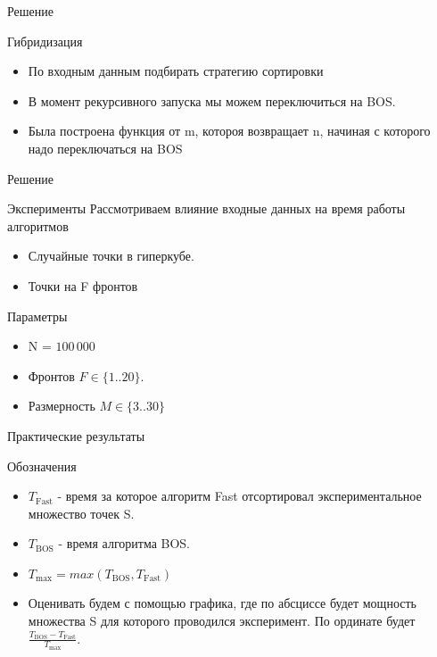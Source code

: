 \documentclass{beamer}
\begin{document}
\begin{frame}{Решение}
\begin{block}{Гибридизация}
\begin{itemize}
\item По входным данным подбирать стратегию сортировки
\item В момент рекурсивного запуска мы можем переключиться на BOS. 
\item Была построена функция от m, котороя возвращает n, начиная с которого надо переключаться на BOS
\end{itemize}
\end{block}
\end{frame}


\begin{frame}{Решение}
\begin{block}{Эксперименты}
Рассмотриваем влияние входные данных на время работы алгоритмов
\begin{itemize}
\item Случайные точки в гиперкубе.
\item Точки на F фронтов
\end{itemize}
Параметры
\begin{itemize}
\item N = $100\,000$
\item Фронтов $F \in \{1 .. 20\}$.
\item Размерность $M \in \{3 .. 30\}$
\end{itemize}
\end{block}
\end{frame}

\begin{frame}{Практические результаты}
\begin{block}{Обозначения}
\begin{itemize}
\item $T_\text{Fast}$ - время за которое алгоритм Fast отсортировал экспериментальное множество точек S.
\item $T_\text{BOS}$ - время алгоритма BOS.
\item $T_\text{max} = max (T_\text{BOS}, T_\text{Fast})$
\item Оценивать будем с помощью графика, где по абсциссе будет мощность множества S для которого проводился эксперимент. По ординате будет $\frac{T_\text{BOS} - T_\text{Fast}}{T_\text{max}}$.
\end{itemize}
\end{block}
\end{frame}
\end{document}
